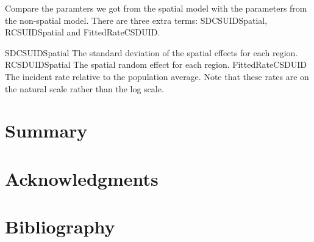 \documentclass{article}
\begin{document}
Compare the paramters we got from the spatial model with the parameters from the non-spatial model. 
There are three extra terms: SDCSUIDSpatial, RCSUIDSpatial and FittedRateCSDUID.

SDCSUIDSpatial     The standard deviation of the spatial effects for each region.
RCSDUIDSpatial     The spatial random effect for each region. 
FittedRateCSDUID   The incident rate relative to the population average. Note that these rates are on the natural scale rather than the log scale. 




\section{Summary}

\section{Acknowledgments}


\section{Bibliography}
\end{document}
